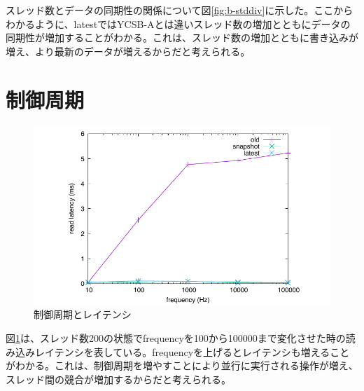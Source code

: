 \documentclass[a4paper]{jreport}	%
\begin{document}
スレッド数とデータの同期性の関係について図\ref{fig:b-stddiv}に示した。ここからわかるように、latestではYCSB-Aとは違いスレッド数の増加とともにデータの同期性が増加することがわかる。これは、スレッド数の増加とともに書き込みが増え、より最新のデータが増えるからだと考えられる。

\section{制御周期}

\begin{figure}[h] 
\centering
\includegraphics[width=15cm]{latency-frequency}
\caption{制御周期とレイテンシ}
\label{fig:latency-frequency}
\end{figure}



図\ref{fig:latency-frequency}は、スレッド数200の状態でfrequencyを100から100000まで変化させた時の読み込みレイテンシを表している。frequencyを上げるとレイテンシも増えることがわかる。これは、制御周期を増やすことにより並行に実行される操作が増え、スレッド間の競合が増加するからだと考えられる。



%
%
\end{document}
